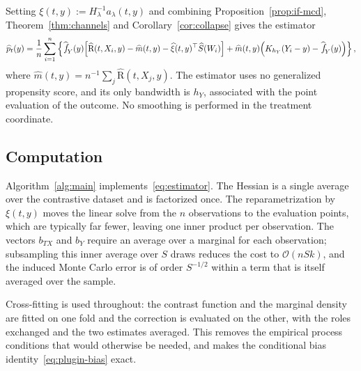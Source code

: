 \documentclass[11pt]{article}
\theoremstyle{plain}
\theoremstyle{definition}
\theoremstyle{remark}
\newcommand{\pfhat}[1]{\ensuremath{\,\mathlarger{\widehat{\textit{f}}}_{#1}}}
\newcommand{\DensityRatio}{\text{R}}
\newcommand{\ks}{k}
\newcommand{\cO}{\mathcal{O}}
\newcommand{\score}{S}
\begin{document}
Setting $\xi(t,y) := H_\lambda^{-1} a_\lambda(t,y)$ and combining
Proposition~\ref{prop:if-mcd}, Theorem~\ref{thm:channels} and
Corollary~\ref{cor:collapse} gives the estimator
\begin{equation}
\widehat p_t(y)
= \frac{1}{n}\sum_{i=1}^{n} \left\{
\pfhat{Y}(y)\Big[
\widehat{\DensityRatio}(t,X_i,y) - \widehat m(t,y)
- \widehat\xi(t,y)^\top \widehat\score(W_i)
\Big]
+ \widehat m(t,y)\Big( K_{h_Y}(Y_i - y) - \pfhat{Y}(y) \Big)
\right\},
\label{eq:estimator}
\end{equation}
where $\widehat m(t,y) = n^{-1}\sum_{j} \widehat{\DensityRatio}(t,X_j,y)$. The estimator
uses no generalized propensity score, and its only bandwidth is $h_Y$, associated with
the point evaluation of the outcome. No smoothing is performed in the treatment
coordinate.

\subsection{Computation}
\label{sec:mcd-algorithm}

Algorithm~\ref{alg:main} implements~\eqref{eq:estimator}. The Hessian is a single average
over the contrastive dataset and is factorized once. The reparametrization by $\xi(t,y)$
moves the linear solve from the $n$ observations to the evaluation points, which are
typically far fewer, leaving one inner product per observation. The vectors $b_{TX}$ and
$b_Y$ require an average over a marginal for each observation; subsampling this inner
average over $S$ draws reduces the cost to $\cO(nS\ks)$, and the induced Monte Carlo
error is of order $S^{-1/2}$ within a term that is itself averaged over the sample.

Cross-fitting \citep{chernozhukov2018} is used throughout: the contrast function and the
marginal density are fitted on one fold and the correction is evaluated on the other,
with the roles exchanged and the two estimates averaged. This removes the empirical
process conditions that would otherwise be needed, and makes the conditional bias
identity~\eqref{eq:plugin-bias} exact.
\end{document}
